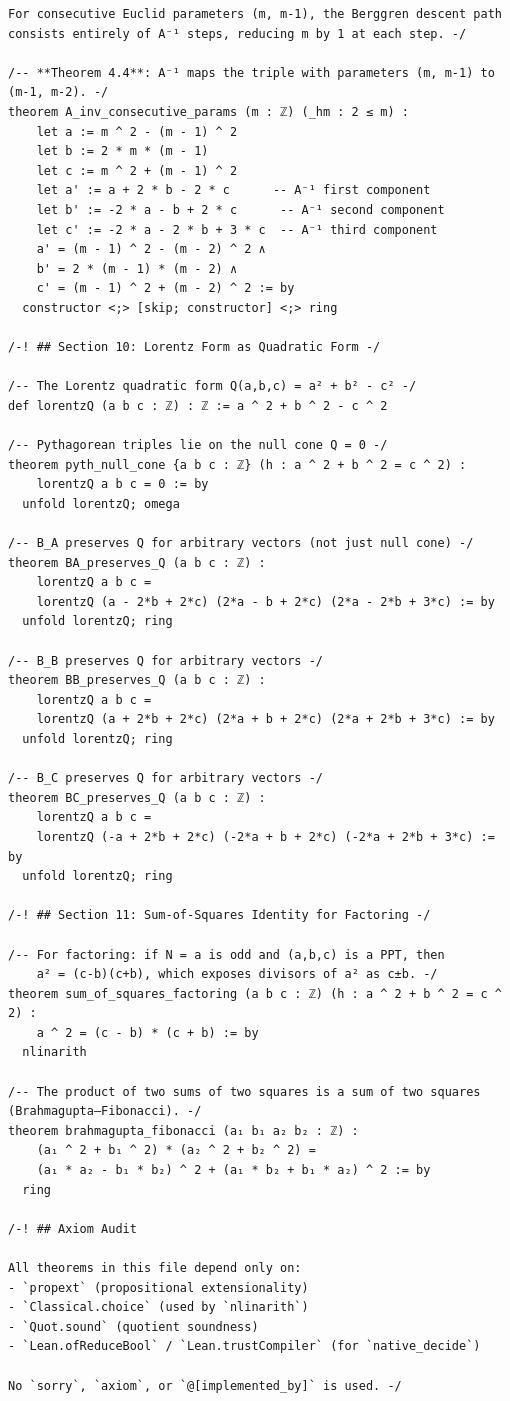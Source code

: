 \documentclass[11pt,openany]{book}
\theoremstyle{definition}
\theoremstyle{plain}
\theoremstyle{remark}
\begin{document}
\begin{lstlisting}[style=lean]
For consecutive Euclid parameters (m, m-1), the Berggren descent path
consists entirely of A⁻¹ steps, reducing m by 1 at each step. -/

/-- **Theorem 4.4**: A⁻¹ maps the triple with parameters (m, m-1) to (m-1, m-2). -/
theorem A_inv_consecutive_params (m : ℤ) (_hm : 2 ≤ m) :
    let a := m ^ 2 - (m - 1) ^ 2
    let b := 2 * m * (m - 1)
    let c := m ^ 2 + (m - 1) ^ 2
    let a' := a + 2 * b - 2 * c      -- A⁻¹ first component
    let b' := -2 * a - b + 2 * c      -- A⁻¹ second component
    let c' := -2 * a - 2 * b + 3 * c  -- A⁻¹ third component
    a' = (m - 1) ^ 2 - (m - 2) ^ 2 ∧
    b' = 2 * (m - 1) * (m - 2) ∧
    c' = (m - 1) ^ 2 + (m - 2) ^ 2 := by
  constructor <;> [skip; constructor] <;> ring

/-! ## Section 10: Lorentz Form as Quadratic Form -/

/-- The Lorentz quadratic form Q(a,b,c) = a² + b² - c² -/
def lorentzQ (a b c : ℤ) : ℤ := a ^ 2 + b ^ 2 - c ^ 2

/-- Pythagorean triples lie on the null cone Q = 0 -/
theorem pyth_null_cone {a b c : ℤ} (h : a ^ 2 + b ^ 2 = c ^ 2) :
    lorentzQ a b c = 0 := by
  unfold lorentzQ; omega

/-- B_A preserves Q for arbitrary vectors (not just null cone) -/
theorem BA_preserves_Q (a b c : ℤ) :
    lorentzQ a b c =
    lorentzQ (a - 2*b + 2*c) (2*a - b + 2*c) (2*a - 2*b + 3*c) := by
  unfold lorentzQ; ring

/-- B_B preserves Q for arbitrary vectors -/
theorem BB_preserves_Q (a b c : ℤ) :
    lorentzQ a b c =
    lorentzQ (a + 2*b + 2*c) (2*a + b + 2*c) (2*a + 2*b + 3*c) := by
  unfold lorentzQ; ring

/-- B_C preserves Q for arbitrary vectors -/
theorem BC_preserves_Q (a b c : ℤ) :
    lorentzQ a b c =
    lorentzQ (-a + 2*b + 2*c) (-2*a + b + 2*c) (-2*a + 2*b + 3*c) := by
  unfold lorentzQ; ring

/-! ## Section 11: Sum-of-Squares Identity for Factoring -/

/-- For factoring: if N = a is odd and (a,b,c) is a PPT, then
    a² = (c-b)(c+b), which exposes divisors of a² as c±b. -/
theorem sum_of_squares_factoring (a b c : ℤ) (h : a ^ 2 + b ^ 2 = c ^ 2) :
    a ^ 2 = (c - b) * (c + b) := by
  nlinarith

/-- The product of two sums of two squares is a sum of two squares (Brahmagupta–Fibonacci). -/
theorem brahmagupta_fibonacci (a₁ b₁ a₂ b₂ : ℤ) :
    (a₁ ^ 2 + b₁ ^ 2) * (a₂ ^ 2 + b₂ ^ 2) =
    (a₁ * a₂ - b₁ * b₂) ^ 2 + (a₁ * b₂ + b₁ * a₂) ^ 2 := by
  ring

/-! ## Axiom Audit

All theorems in this file depend only on:
- `propext` (propositional extensionality)
- `Classical.choice` (used by `nlinarith`)
- `Quot.sound` (quotient soundness)
- `Lean.ofReduceBool` / `Lean.trustCompiler` (for `native_decide`)

No `sorry`, `axiom`, or `@[implemented_by]` is used. -/
\end{lstlisting}
\end{document}
